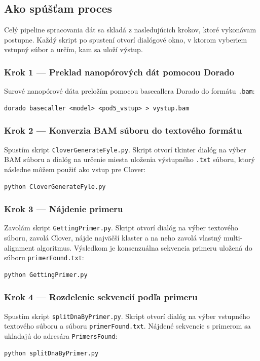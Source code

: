 \subsection{Ako spúšťam proces}
Celý pipeline spracovania dát sa skladá z nasledujúcich krokov, ktoré vykonávam postupne. Každý skript po spustení otvorí dialógové okno, v ktorom vyberiem vstupný súbor a určím, kam sa uloží výstup.

\subsubsection*{Krok 1 — Preklad nanopórových dát pomocou Dorado}
Surové nanopórové dáta preložím pomocou basecallera Dorado do formátu \texttt{.bam}:
\begin{verbatim}
dorado basecaller <model> <pod5_vstup> > vystup.bam
\end{verbatim}

\subsubsection*{Krok 2 — Konverzia BAM súboru do textového formátu}
Spustím skript \texttt{CloverGenerateFyle.py}. Skript otvorí tkinter dialóg na výber BAM súboru a dialóg na určenie miesta uloženia výstupného \texttt{.txt} súboru, ktorý následne môžem použiť ako vstup pre Clover:
\begin{verbatim}
python CloverGenerateFyle.py
\end{verbatim}

\subsubsection*{Krok 3 — Nájdenie primeru}
Zavolám skript \texttt{GettingPrimer.py}. Skript otvorí dialóg na výber textového súboru, zavolá Clover, nájde najväčší klaster a na neho zavolá vlastný multi-alignment algoritmus. Výsledkom je konsenzuálna sekvencia primeru uložená do súboru \texttt{primerFound.txt}:
\begin{verbatim}
python GettingPrimer.py
\end{verbatim}

\subsubsection*{Krok 4 — Rozdelenie sekvencií podľa primeru}
Spustím skript \texttt{splitDnaByPrimer.py}. Skript otvorí dialóg na výber vstupného textového súboru a súboru \texttt{primerFound.txt}. Nájdené sekvencie s primerom sa ukladajú do adresára \texttt{PrimersFound}:
\begin{verbatim}
python splitDnaByPrimer.py
\end{verbatim}

